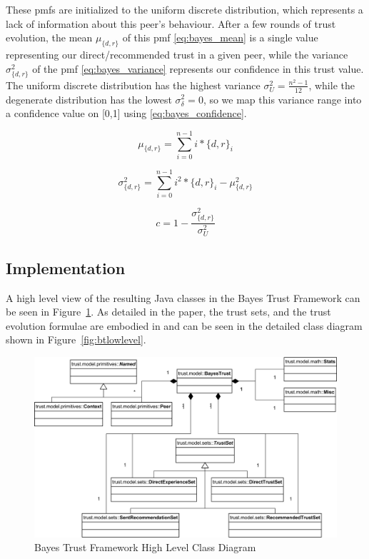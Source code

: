 These pmfs are initialized to the uniform discrete distribution, which
represents a lack of information about this peer's behaviour. After a few rounds
of trust evolution, the mean $\mu_{\{d,r\}}$ of this pmf \eqref{eq:bayes_mean}
is a single value representing our direct/recommended trust in a given peer,
while the variance $\sigma^2_{\{d,r\}}$ of the pmf \eqref{eq:bayes_variance}
represents our confidence in this trust value. The uniform discrete distribution
has the highest variance $\sigma^2_U = \frac{n^2-1}{12}$, while the degenerate
distribution has the lowest $\sigma^2_\delta = 0$, so we map this variance range
into a confidence value on [0,1] using \eqref{eq:bayes_confidence}.

\begin{equation}
\label{eq:bayes_mean}
\mu_{\{d,r\}} = \sum_{i=0}^{n-1}{i*{\{d,r\}}_i}
\end{equation}

\begin{equation}
\label{eq:bayes_variance}
\sigma^2_{\{d,r\}} = \sum_{i=0}^{n-1}{i^2*{\{d,r\}}_i} - \mu^2_{\{d,r\}}
\end{equation}

\begin{equation}
\label{eq:bayes_confidence}
c = 1 - \frac{\sigma^2_{\{d,r\}}}{\sigma^2_U}
\end{equation}


\subsection{Implementation}
A high level view of the resulting Java classes in the Bayes Trust Framework
can be seen in Figure~\ref{fig:bthighlevel}.  As detailed in the paper, the
trust sets, and the trust evolution formulae are embodied in and can be seen in
the detailed class diagram shown in Figure~\ref{fig:btlowlevel}.

\begin{figure}[h!]
  \centering
  \includegraphics[width=1\textwidth]{images/bayestrust}
  \caption{\label{fig:bthighlevel}Bayes Trust Framework High Level Class
  Diagram}
\end{figure}


